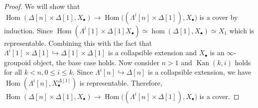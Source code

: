 \documentclass[12pt]{amsart}
\theoremstyle{definition}
\theoremstyle{remark}
\numberwithin{equation}{section}
\newcommand{\1}{{\mathbb{1}}}
\newcommand{\Hom}{\operatorname{Hom}}
\newcommand{\kan}{\operatorname{Kan}}
\begin{document}
\begin{proof}
	We will show that $\Hom (\Delta[n]\times \Delta[1],X_{\bullet} )\to \Hom \big((\Lambda^i[n]\times \Delta[1]),  X_{\bullet}\big)$ is a cover by induction. Since  $\Hom(\Lambda^i[1]\times \Delta[1]X_{\bullet})\simeq \hom(\Delta[1], X_{\bullet})\simeq X_1$ which is representable. Combining this with the fact that $\Lambda^i[1]\times \Delta[1]\hookrightarrow \Delta[1]\times \Delta[1]$ is a collapsible extension and $X_{\bullet}$ is an $\infty$-groupoid object, the base case holds. Now consider $n>1$ and $\kan(k,i)$ holds for all $k<n, 0\le i\le k$. Since $\Lambda^i[n] \hookrightarrow \Delta[n]$ is a collapsible extension, we have $\Hom(\Lambda^i[n], X_{\bullet}^{\Delta[1]})$ is representable. Therefore, $\Hom (\Delta[n]\times \Delta[1],X_{\bullet} )\to \Hom \big((\Lambda^i[n]\times \Delta[1]),  X_{\bullet}\big)$ is a cover. 
	\end{proof}
\end{document}
